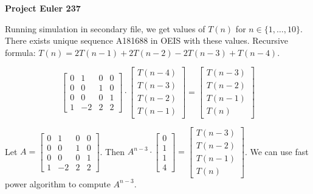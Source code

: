 \documentclass[a4paper,12pt]{article}
\begin{document}
\setlength\parindent{0pt}
\textbf{Project Euler 237}
\vspace{5ex}

Running simulation in secondary file, we get values of \(T(n)\) for \(n \in \{1, \dots, 10\}\). There exists unique sequence A181688 in OEIS with these values. Recursive formula: \(T(n) = 2T(n-1) + 2T(n-2) - 2T(n-3) + T(n-4)\).

\[\begin{bmatrix}
0 & 1 & 0 & 0 \\ 0 & 0 & 1 & 0 \\ 0 & 0 & 0 & 1 \\ 1 & -2 & 2 & 2
\end{bmatrix}
\cdot
\begin{bmatrix} T(n - 4) \\ T(n - 3) \\ T(n - 2) \\ T(n - 1) \end{bmatrix}
=
\begin{bmatrix} T(n - 3) \\ T(n - 2) \\ T(n - 1) \\ T(n) \end{bmatrix}\]

Let \(A = \begin{bmatrix}
0 & 1 & 0 & 0 \\ 0 & 0 & 1 & 0 \\ 0 & 0 & 0 & 1 \\ 1 & -2 & 2 & 2
\end{bmatrix}\).
Then \(A^{n - 3} \cdot \begin{bmatrix} 0 \\ 1 \\ 1 \\ 4 \end{bmatrix} = \begin{bmatrix} T(n - 3) \\ T(n - 2) \\ T(n - 1) \\ T(n) \end{bmatrix}\).
We can use fast power algorithm to compute \(A^{n - 3}\).
\end{document}
